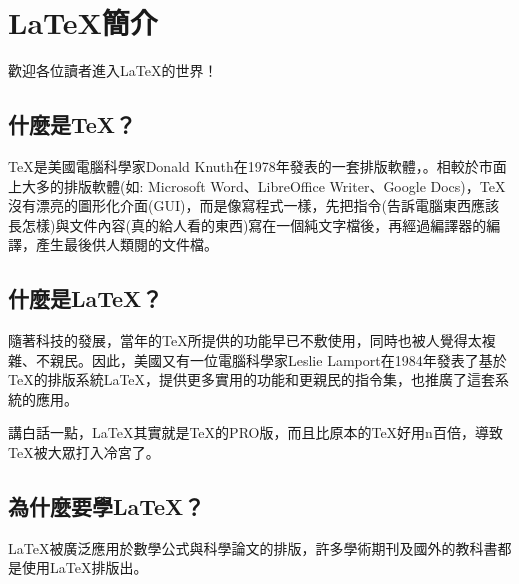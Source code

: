 \documentclass[12pt, a4paper, oneside]{extbook}
\let\tmpTeX\TeX
\renewcommand{\TeX}{\textrm{\tmpTeX}}
\let\tmpLaTeX\LaTeX
\renewcommand{\LaTeX}{\textrm{\tmpLaTeX}}
\begin{document}
	
	

	\chapter{\LaTeX 簡介}
		歡迎各位讀者進入\LaTeX 的世界！
		
		

	\section{什麼是\TeX ？}
		\TeX 是美國電腦科學家Donald Knuth在1978年發表的一套排版軟體，。相較於市面上大多的排版軟體(如: Microsoft Word、LibreOffice Writer、Google Docs)，\TeX 沒有漂亮的圖形化介面(GUI)，而是像寫程式一樣，先把指令(告訴電腦東西應該長怎樣)與文件內容(真的給人看的東西)寫在一個純文字檔後，再經過編譯器的編譯，產生最後供人類閱的文件檔。
	\section{什麼是\LaTeX ？}
		隨著科技的發展，當年的\TeX 所提供的功能早已不敷使用，同時也被人覺得太複雜、不親民。因此，美國又有一位電腦科學家Leslie Lamport在1984年發表了基於\TeX 的排版系統\LaTeX ，提供更多實用的功能和更親民的指令集，也推廣了這套系統的應用。
		
		講白話一點，\LaTeX 其實就是\TeX 的PRO版，而且比原本的\TeX 好用n百倍，導致\TeX 被大眾打入冷宮了。

	\section{為什麼要學\LaTeX ？}
		\LaTeX 被廣泛應用於數學公式與科學論文的排版，許多學術期刊及國外的教科書都是使用\LaTeX 排版出。
\end{document}
